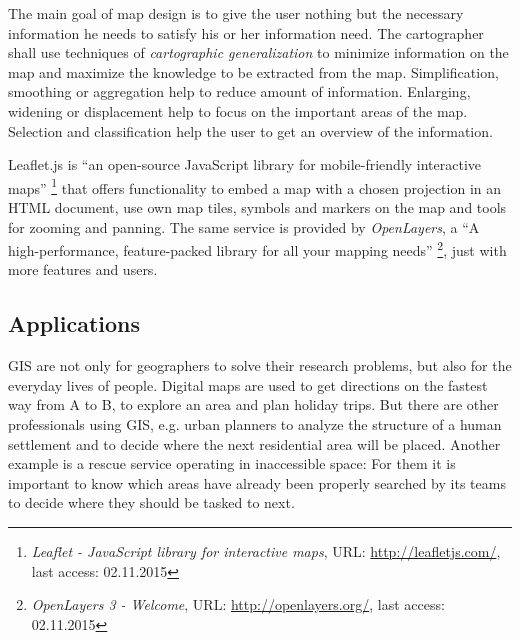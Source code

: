 The main goal of map design is to give the user nothing but the necessary information he needs to satisfy his or her information need. The cartographer shall use techniques of \emph{cartographic generalization} to minimize information on the map and maximize the knowledge to be extracted from the map. Simplification, smoothing or aggregation help to reduce amount of information. Enlarging, widening or displacement help to focus on the important areas of the map. Selection and classification help the user to get an overview of the information.
\cite{krygier2005making}

Leaflet.js is ``an open-source JavaScript library for mobile-friendly interactive maps''
\footnote{
  \textit{Leaflet - JavaScript library for interactive maps},
  URL: \url{http://leafletjs.com/},
  last access: 02.11.2015
}
that offers functionality to embed a map with a chosen projection in an HTML document, use own map tiles, symbols and markers on the map and tools for zooming and panning.
The same service is provided by \emph{OpenLayers}, a ``A high-performance, feature-packed library for all your mapping needs''
\footnote{
  \textit{OpenLayers 3 - Welcome},
  URL: \url{http://openlayers.org/},
  last access: 02.11.2015
}, just with more features and users.




\subsection{Applications} %
\label{sub:gis_applications}

GIS are not only for geographers to solve their research problems, but also for the everyday lives of people. Digital maps are used to get directions on the fastest way from A to B, to explore an area and plan holiday trips. But there are other professionals using GIS, e.g. urban planners to analyze the structure of a human settlement and to decide where the next residential area will be placed. Another example is a rescue service operating in inaccessible space: For them it is important to know which areas have already been properly searched by its teams to decide where they should be tasked to next.


